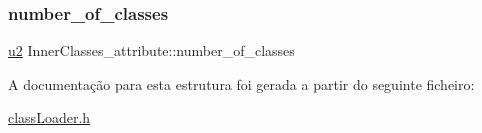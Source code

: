\subsubsection{\texorpdfstring{number\+\_\+of\+\_\+classes}{number\_of\_classes}}
{\footnotesize\ttfamily \hyperlink{util_8h_a55ef8d87fd202b8417704c089899c5b9}{u2} Inner\+Classes\+\_\+attribute\+::number\+\_\+of\+\_\+classes}



A documentação para esta estrutura foi gerada a partir do seguinte ficheiro\+:\begin{DoxyCompactItemize}
\item 
\hyperlink{class_loader_8h}{class\+Loader.\+h}\end{DoxyCompactItemize}
